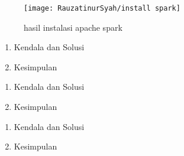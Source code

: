 \begin{figure}[!ht]
\texttt{[image: RauzatinurSyah/install spark]}
\caption{hasil instalasi apache spark }
\label{gam:hasil instalasi spark}
\end{figure}


\begin{enumerate}
\item Kendala dan Solusi

\item Kesimpulan

\end{enumerate}


\begin{enumerate}
\item Kendala dan Solusi

\item Kesimpulan

\end{enumerate}


\begin{enumerate}
\item Kendala dan Solusi

\item Kesimpulan

\end{enumerate}

